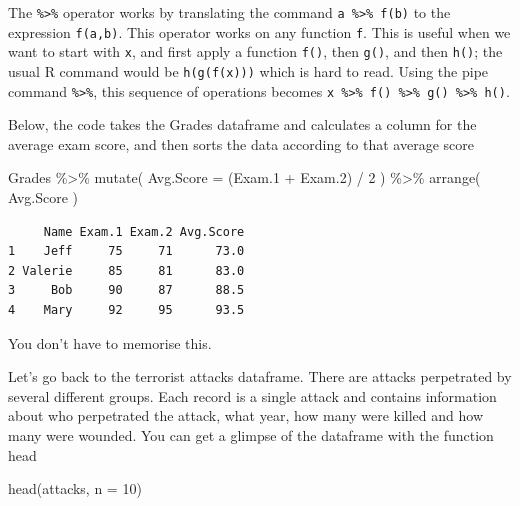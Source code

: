 \documentclass[
  letterpaper,
  DIV=11,
  numbers=noendperiod]{scrreprt}
\newenvironment{Shaded}{\begin{snugshade}}{\end{snugshade}}
\newcommand{\AttributeTok}[1]{\textcolor[rgb]{0.40,0.45,0.13}{#1}}
\newcommand{\DecValTok}[1]{\textcolor[rgb]{0.68,0.00,0.00}{#1}}
\newcommand{\FloatTok}[1]{\textcolor[rgb]{0.68,0.00,0.00}{#1}}
\newcommand{\FunctionTok}[1]{\textcolor[rgb]{0.28,0.35,0.67}{#1}}
\newcommand{\NormalTok}[1]{\textcolor[rgb]{0.00,0.23,0.31}{#1}}
\newcommand{\SpecialCharTok}[1]{\textcolor[rgb]{0.37,0.37,0.37}{#1}}
\begin{document}
The \texttt{\%\textgreater{}\%} operator works by translating the
command \texttt{a\ \%\textgreater{}\%\ f(b)} to the expression
\texttt{f(a,b)}. This operator works on any function \texttt{f}. This is
useful when we want to start with \texttt{x}, and first apply a function
\texttt{f()}, then \texttt{g()}, and then \texttt{h()}; the usual R
command would be \texttt{h(g(f(x)))} which is hard to read. Using the
pipe command \texttt{\%\textgreater{}\%}, this sequence of operations
becomes
\texttt{x\ \%\textgreater{}\%\ f()\ \%\textgreater{}\%\ g()\ \%\textgreater{}\%\ h()}.

Below, the code takes the Grades dataframe and calculates a column for
the average exam score, and then sorts the data according to that
average score

\begin{Shaded}
\begin{Highlighting}[]
\NormalTok{Grades }\SpecialCharTok{\%\textgreater{}\%}   \FunctionTok{mutate}\NormalTok{( }\AttributeTok{Avg.Score =}\NormalTok{ (Exam}\FloatTok{.1} \SpecialCharTok{+}\NormalTok{ Exam}\FloatTok{.2}\NormalTok{) }\SpecialCharTok{/} \DecValTok{2}\NormalTok{ ) }\SpecialCharTok{\%\textgreater{}\%}   \FunctionTok{arrange}\NormalTok{( Avg.Score )}
\end{Highlighting}
\end{Shaded}

\begin{verbatim}
     Name Exam.1 Exam.2 Avg.Score
1    Jeff     75     71      73.0
2 Valerie     85     81      83.0
3     Bob     90     87      88.5
4    Mary     92     95      93.5
\end{verbatim}

You don't have to memorise this.

Let's go back to the terrorist attacks dataframe. There are attacks
perpetrated by several different groups. Each record is a single attack
and contains information about who perpetrated the attack, what year,
how many were killed and how many were wounded. You can get a glimpse of
the dataframe with the function head

\begin{Shaded}
\begin{Highlighting}[]
\FunctionTok{head}\NormalTok{(attacks, }\AttributeTok{n =} \DecValTok{10}\NormalTok{)}
\end{Highlighting}
\end{Shaded}
\end{document}
